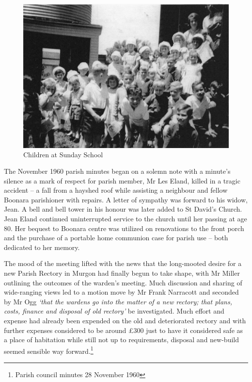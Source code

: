 \begin{figure}[!htb]
\begin{center}
\includegraphics[width=1.\textwidth,center]{../images/sundaySchoolChildren.jpg}
\caption{Children at Sunday School}
\end{center}
\end{figure}




The November 1960 parish minutes began on a solemn note with a minute's silence as a mark of respect for parish member, Mr Les Eland, killed in a tragic accident -- a fall from a hayshed roof while assisting a neighbour and fellow Boonara parishioner with repairs. A letter of sympathy was forward to his widow, Jean. A bell and bell tower in his honour was later added to St David's Church. Jean Eland continued uninterrupted service to the church until her passing at age 80. Her bequest to Boonara centre was utilized on renovations to the front porch and the purchase of a portable home communion case for parish use -- both dedicated to her memory.



The mood of the meeting lifted with the news that the long-mooted desire for a new Parish Rectory in Murgon had finally begun to take shape, with Mr Miller outlining the outcomes of the warden's meeting. Much discussion and sharing of wide-ranging views led to a motion move by Mr Frank Narracott and seconded by Mr Ogg \emph{`that the wardens go into the matter of a new rectory; that plans, costs, finance and disposal of old rectory'} be investigated. Much effort and expense had already been expended on the old and deteriorated rectory and with further expenses considered to be around \pounds300 just to have it considered safe as a place of habitation while still not up to requirements, disposal and new-build seemed sensible way forward.\footnote{Parish council minutes 28 November 1960}


